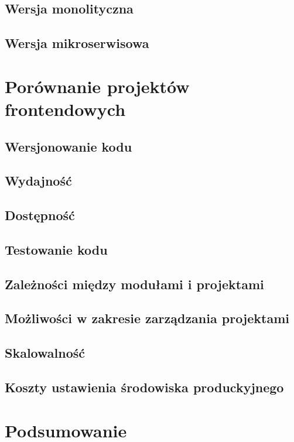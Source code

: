 \documentclass{SGGW-thesis}
\begin{document}
  \section{Wersja monolityczna}
  \section{Wersja mikroserwisowa}

\chapter{Porównanie projektów frontendowych}
  \section{Wersjonowanie kodu}
  \section{Wydajność}
  \section{Dostępność}
  \section{Testowanie kodu}
  \section{Zależności między modułami i projektami}
  \section{Możliwości w zakresie zarządzania projektami}
  \section{Skalowalność}
  \section{Koszty ustawienia środowiska produckyjnego}

\chapter{Podsumowanie}

\nocite{*}
\printbibliography[heading=bibnumbered,title={Bibliografia}]

\beforelastpage
\end{document}

